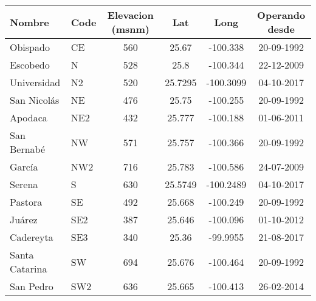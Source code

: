 \begin{table}[H]
    \begin{tabular}{llcccc} \hline
    Nombre         & Code       & Elevacion (msnm) & Lat     & Long      & Operando desde \\ \hline
    Obispado       & CE         & 560              & 25.67   & -100.338  & 20-09-1992     \\
    Escobedo       & N          & 528              & 25.8    & -100.344  & 22-12-2009     \\
    Universidad    & N2         & 520              & 25.7295 & -100.3099 & 04-10-2017     \\
    San Nicolás    & NE         & 476              & 25.75   & -100.255  & 20-09-1992     \\
    Apodaca        & NE2        & 432              & 25.777  & -100.188  & 01-06-2011     \\
    San Bernabé    & NW         & 571              & 25.757  & -100.366  & 20-09-1992     \\
    García         & NW2        & 716              & 25.783  & -100.586  & 24-07-2009     \\
    Serena         & S          & 630              & 25.5749 & -100.2489 & 04-10-2017     \\
    Pastora        & SE         & 492              & 25.668  & -100.249  & 20-09-1992     \\
    Juárez         & SE2        & 387              & 25.646  & -100.096  & 01-10-2012     \\
    Cadereyta      & SE3        & 340              & 25.36   & -99.9955  & 21-08-2017     \\
    Santa Catarina & SW         & 694              & 25.676  & -100.464  & 20-09-1992     \\
    San Pedro      & SW2        & 636              & 25.665  & -100.413  & 26-02-2014     \\ \hline
    \end{tabular}
\caption{}
\label{table:stations_loc}
\end{table}